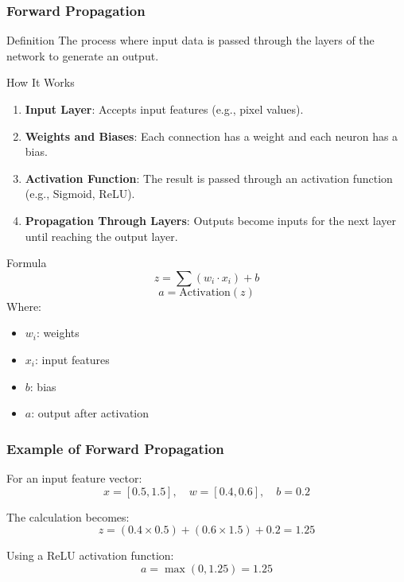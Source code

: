 \documentclass[aspectratio=169]{beamer}
\begin{document}
\begin{frame}[fragile]
    \frametitle{Forward Propagation}
    \begin{block}{Definition}
        The process where input data is passed through the layers of the network to generate an output.
    \end{block}
    
    \begin{block}{How It Works}
        \begin{enumerate}
            \item \textbf{Input Layer}: Accepts input features (e.g., pixel values).
            \item \textbf{Weights and Biases}: Each connection has a weight and each neuron has a bias.
            \item \textbf{Activation Function}: The result is passed through an activation function (e.g., Sigmoid, ReLU).
            \item \textbf{Propagation Through Layers}: Outputs become inputs for the next layer until reaching the output layer.
        \end{enumerate}
    \end{block}

    \begin{block}{Formula}
        \begin{equation}
            z = \sum (w_i \cdot x_i) + b
        \end{equation}
        \begin{equation}
            a = \text{Activation}(z)
        \end{equation}
        Where:
        \begin{itemize}
            \item \( w_i \): weights
            \item \( x_i \): input features
            \item \( b \): bias
            \item \( a \): output after activation
        \end{itemize}
    \end{block}
\end{frame}

\begin{frame}[fragile]
    \frametitle{Example of Forward Propagation}
    For an input feature vector:
    \[
    x = [0.5, 1.5], \quad w = [0.4, 0.6], \quad b = 0.2
    \]

    The calculation becomes:
    \[
    z = (0.4 \times 0.5) + (0.6 \times 1.5) + 0.2 = 1.25
    \]
    
    Using a ReLU activation function:
    \[
    a = \max(0, 1.25) = 1.25
    \]
\end{frame}
\end{document}
